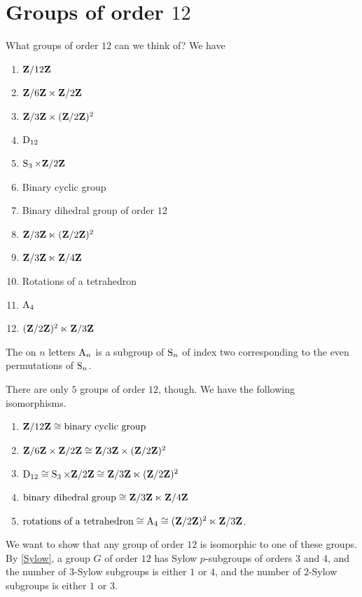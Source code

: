 \documentclass[11pt, oneside]{amsart}
\begin{document}
\section{Groups of order $12$}
What groups of order $12$ can we think of? We have 
\begin{enumerate}
\item $\mathbf Z/12\mathbf Z$ 
\item $\mathbf Z/6\mathbf Z\times \mathbf Z/2\mathbf Z$
\item $\mathbf Z/3\mathbf Z\times (\mathbf Z/2\mathbf Z)^2$
\item  $\operatorname{D}_{12}$
\item  $\operatorname{S}_3 \times \mathbf Z/2\mathbf Z$
\item Binary cyclic group 
\item Binary dihedral group of order $12$
\item $\mathbf Z/3\mathbf Z \ltimes (\mathbf Z/2\mathbf Z)^2$
\item $\mathbf Z/3\mathbf Z \ltimes \mathbf Z / 4\mathbf Z$
\item Rotations of a tetrahedron
\item $\operatorname{A}_4$
\item $(\mathbf Z / 2\mathbf Z)^2 \ltimes \mathbf Z / 3\mathbf Z$
\end{enumerate}

\begin{definition}
The  on $n$ letters $\operatorname{A}_n$ is a subgroup of $\operatorname{S}_n$ of index two corresponding to the even permutations of $\operatorname{S}_n$.
\end{definition}

There are only $5$ groups of order $12$, though. We have the following isomorphisms. 
\begin{enumerate}
\item $\mathbf Z / 12\mathbf Z\cong \textrm{binary cyclic group}$
\item  $\mathbf Z / 6\mathbf Z \times \mathbf Z / 2\mathbf Z \cong \mathbf Z / 3\mathbf Z \times (\mathbf Z / 2\mathbf Z)^2$
\item $\operatorname{D}_{12} \cong \operatorname{S}_3 \times \mathbf Z/2\mathbf Z \cong \mathbf Z / 3\mathbf Z \ltimes (\mathbf Z/2\mathbf Z)^2$
\item $\textrm{binary dihedral group} \cong \mathbf Z/3\mathbf Z \ltimes \mathbf Z/4\mathbf Z$
\item $\textrm{rotations of a tetrahedron} \cong \operatorname{A}_4 \cong (\mathbf Z/2\mathbf Z)^2 \ltimes \mathbf Z / 3\mathbf Z$.
\end{enumerate}

We want to show that any group of order $12$ is isomorphic to one of these groups. By \cref{Sylow}, a group $G$ of order $12$ has Sylow $p$-subgroups of orders $3$ and $4$, and the number of $3$-Sylow subgroups is either $1$ or $4$, and the number of $2$-Sylow subgroups is either $1$ or $3$.
\end{document}
